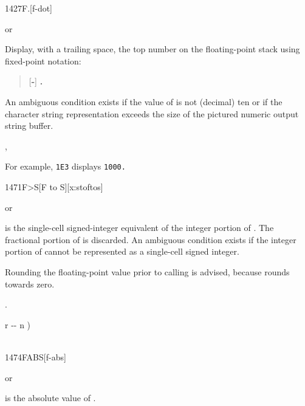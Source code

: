 \enlargethispage{8ex}
\begin{worddef}[Fd]{1427}{F.{}}[f-dot]
\item \stack{}{}  or

	Display, with a trailing space, the top number on the
	floating-point stack using fixed-point notation:
	\begin{quote}
		[\textbf{-}] \textbf{.}
	\end{quote}
	An ambiguous condition exists if the value of 
	is not (decimal) ten or if the character string representation
	exceeds the size of the pictured numeric output string buffer.

\see {},

	\begin{rationale} %
		For example, \texttt{1E3}  displays \texttt{1000.}
	\end{rationale}
\end{worddef}



\begin{worddef}[FtoS]{1471}{F>S}[F to S][x:stoftos]
\item {}  or 

	 is the single-cell signed-integer equivalent of the
	integer portion of .  The fractional portion of
	 is discarded.  An ambiguous condition exists if
	the integer portion of  cannot be represented as a
	single-cell signed integer.

\note Rounding the floating-point value prior to calling  is
	advised, because  rounds towards zero.

\see {}.

	\begin{implement}
		\word{:}   r -{}- n ) \\
		\tab {}  \\
		\word{;}
	\end{implement}
\end{worddef}


\begin{worddef}{1474}{FABS}[f-abs]
\item {} or

	 is the absolute value of .
\end{worddef}


